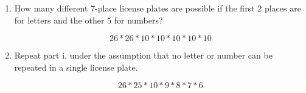 \item
\begin{enumerate}
    \item How many different 7-place license plates are possible if the first 2 places are for letters and the other 5 for numbers?

    \[ {26 * 26} * {10 * 10 * 10 * 10 * 10} \]

    \item Repeat part i. under the assumption that no letter or number can be repeated in a single license plate.

    \[ {26 * 25} * {10 * 9 * 8 * 7 * 6} \]
    
\end{enumerate}